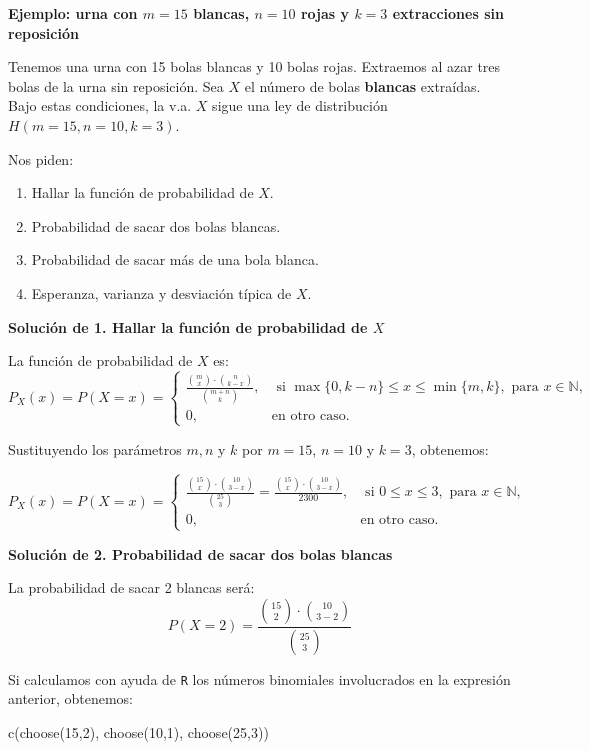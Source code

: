 \documentclass[
  letterpaper,
  DIV=11,
  numbers=noendperiod]{scrreprt}
\newenvironment{Shaded}{\begin{snugshade}}{\end{snugshade}}
\newcommand{\DecValTok}[1]{\textcolor[rgb]{0.68,0.00,0.00}{#1}}
\newcommand{\FunctionTok}[1]{\textcolor[rgb]{0.28,0.35,0.67}{#1}}
\newcommand{\NormalTok}[1]{\textcolor[rgb]{0.00,0.23,0.31}{#1}}
\providecommand{\tightlist}{%
  \setlength{\itemsep}{0pt}\setlength{\parskip}{0pt}}\usepackage{longtable,booktabs,array}
\begin{document}
\textbf{Ejemplo: urna con \(m=15\) blancas, \(n=10\) rojas y \(k=3\)
extracciones sin reposición}

Tenemos una urna con 15 bolas blancas y 10 bolas rojas. Extraemos al
azar tres bolas de la urna sin reposición. Sea \(X\) el número de bolas
\textbf{blancas} extraídas. Bajo estas condiciones, la v.a. \(X\) sigue
una ley de distribución \(H(m=15,n=10,k=3)\).

Nos piden:

\begin{enumerate}
\def\labelenumi{\arabic{enumi}.}
\tightlist
\item
  Hallar la función de probabilidad de \(X\).
\item
  Probabilidad de sacar dos bolas blancas.
\item
  Probabilidad de sacar más de una bola blanca.
\item
  Esperanza, varianza y desviación típica de \(X\).
\end{enumerate}

\textbf{Solución de 1. Hallar la función de probabilidad de \(X\)}

La función de probabilidad de \(X\) es: \[
P_X(x)=P(X=x)=\left\{
\begin{array}{ll}
\frac{\binom{m}{x}\cdot \binom{n}{k-x}}{\binom{m+n}{k}}, & \mbox{ si }
\max\{0,k-n\}\leq x \leq \min\{m,k\}, \mbox { para  } x\in \mathbb{N},\\
0,  & \mbox{en otro caso.}\end{array}\right.
\]

Sustituyendo los parámetros \(m,n\) y \(k\) por \(m=15\), \(n=10\) y
\(k=3\), obtenemos:

\[
P_X(x)=P(X=x)=\left\{
\begin{array}{ll}
\frac{\binom{15}{x}\cdot \binom{10}{3-x}}{\binom{25}{3}}= \frac{\binom{15}{x}\cdot \binom{10}{3-x}}{2300}, & \mbox{ si }
0\leq x \leq 3, \mbox { para  } x\in \mathbb{N},\\
0,  & \mbox{en otro caso.}\end{array}\right.
\]

\textbf{Solución de 2. Probabilidad de sacar dos bolas blancas}

La probabilidad de sacar 2 blancas será: \[
P(X=2)=\frac{\binom{15}{2}\cdot \binom{10}{3-2}}{\binom{25}{3}}
\]

Si calculamos con ayuda de \texttt{R} los números binomiales
involucrados en la expresión anterior, obtenemos:

\begin{Shaded}
\begin{Highlighting}[]
\FunctionTok{c}\NormalTok{(}\FunctionTok{choose}\NormalTok{(}\DecValTok{15}\NormalTok{,}\DecValTok{2}\NormalTok{), }\FunctionTok{choose}\NormalTok{(}\DecValTok{10}\NormalTok{,}\DecValTok{1}\NormalTok{), }\FunctionTok{choose}\NormalTok{(}\DecValTok{25}\NormalTok{,}\DecValTok{3}\NormalTok{))}
\end{Highlighting}
\end{Shaded}
\end{document}
